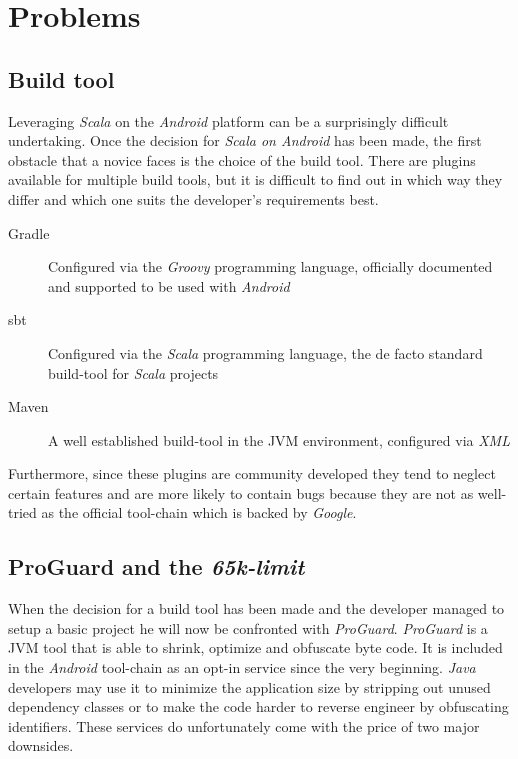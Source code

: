 \section{Problems}

\subsection{Build tool}

Leveraging \textit{Scala} on the \textit{Android} platform can be a surprisingly difficult undertaking. Once the decision for \textit{Scala on Android} has been made, the  first obstacle that a novice faces is the choice of the build tool. There are plugins available for multiple build tools, but it is difficult to find out in which way they differ and which one suits the developer's requirements best.

\begin{description}

	\item[Gradle]\hfill

	Configured via the \textit{Groovy} programming language, officially documented and supported to be used with \textit{Android}

	\item[\ac{sbt}]\hfill

	Configured via the \textit{Scala} programming language, the de facto standard build-tool for \textit{Scala} projects

	\item[Maven]\hfill

	A well established build-tool in the \ac{JVM} environment, configured via \textit{XML}

\end{description}

Furthermore, since these plugins are community developed they tend to neglect certain features and are more likely to contain bugs because they are not as well-tried as the official tool-chain which is backed by \textit{Google}.

\subsection{ProGuard and the \textit{65k-limit}}

When the decision for a build tool has been made and the developer managed to setup a basic project he will now be confronted with \textit{ProGuard}. \textit{ProGuard} is a \ac{JVM} tool that is able to shrink, optimize and obfuscate byte code. It is included in the \textit{Android} tool-chain as an opt-in service since the very beginning. \textit{Java} developers may use it to minimize the application size by stripping out unused dependency classes or to make the code harder to reverse engineer by obfuscating identifiers. These services do unfortunately come with the price of two major downsides.

